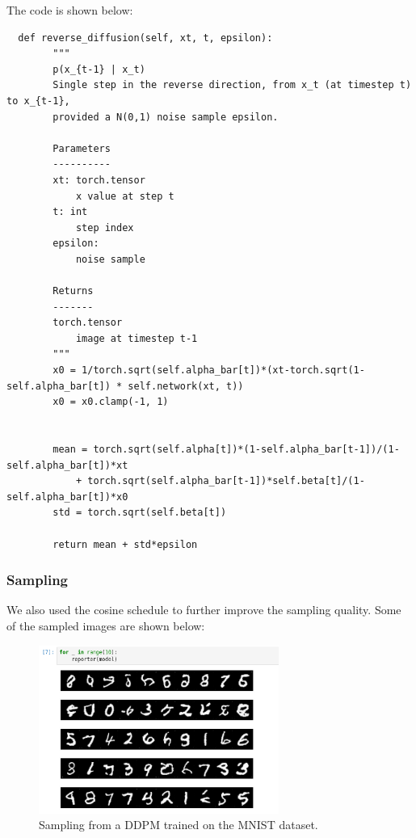 The code is shown below:
\begin{verbatim}
  def reverse_diffusion(self, xt, t, epsilon):
        """
        p(x_{t-1} | x_t)
        Single step in the reverse direction, from x_t (at timestep t) to x_{t-1},
        provided a N(0,1) noise sample epsilon.

        Parameters
        ----------
        xt: torch.tensor
            x value at step t
        t: int
            step index
        epsilon:
            noise sample

        Returns
        -------
        torch.tensor
            image at timestep t-1
        """
        x0 = 1/torch.sqrt(self.alpha_bar[t])*(xt-torch.sqrt(1-self.alpha_bar[t]) * self.network(xt, t))
        x0 = x0.clamp(-1, 1)
        
        
        mean = torch.sqrt(self.alpha[t])*(1-self.alpha_bar[t-1])/(1-self.alpha_bar[t])*xt 
            + torch.sqrt(self.alpha_bar[t-1])*self.beta[t]/(1-self.alpha_bar[t])*x0
        std = torch.sqrt(self.beta[t])
        
        return mean + std*epsilon
\end{verbatim}

\subsubsection{Sampling}
We also used the cosine schedule to further improve the sampling quality.
Some of the sampled images are shown below:
\begin{figure}[!h]
  \centering
  \includegraphics[width=0.7\textwidth]{./figures/ddpm_sampling.png}
  \caption{
    Sampling from a DDPM trained on the MNIST dataset.
  }
  \label{fig:week6:ddpm:sampling}
\end{figure}
